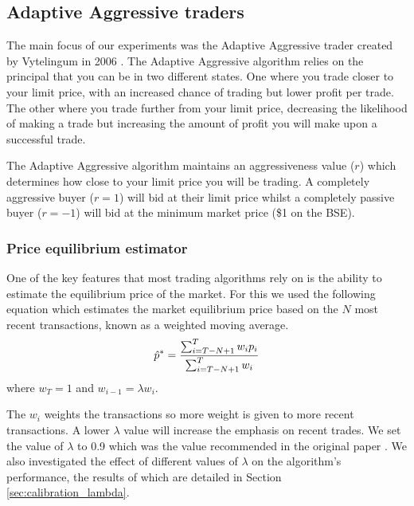 \documentclass[preprint]{acm_proc_article-sp} %
\begin{document}
\subsection{Adaptive Aggressive traders} \label{sec:AA}
The main focus of our experiments was the Adaptive Aggressive trader created by
Vytelingum in 2006 \cite{AA_thesis}. The Adaptive Aggressive algorithm relies on the principal that you can be in
two different states. One where you trade closer to your limit
price, with an increased chance of trading but lower profit per trade. The other where you
trade further from your limit price, decreasing the likelihood of making a
trade but increasing the amount of profit you will make upon a successful trade.

The Adaptive Aggressive algorithm maintains an aggressiveness value ($r$) which
determines how close to your limit price you will be trading. A completely
aggressive buyer ($r = 1$) will bid at their limit price whilst a completely
passive buyer ($r = -1$) will bid at the minimum market price (\$1 on the BSE).\\



\subsubsection{Price equilibrium estimator}
One of the key features that most trading algorithms rely on is the ability to
estimate the equilibrium price of the market. For this we used the following
equation which estimates the market equilibrium price based on the $N$ most
recent transactions, known as a weighted moving average.  \begin{equation} \hat
p^* = \frac{\sum^T_{i=T-N+1}w_ip_i}{\sum^T_{i=T-N+1}w_i}\\
\label{eqn:equilibrium_estimator} \end{equation} where $w_T = 1$ and $w_{i-1} =
\lambda w_i$.

The $w_i$ weights the transactions so more weight is given to more recent
transactions. A lower $\lambda$ value will increase the emphasis on recent
trades. We set the value of $\lambda$ to 0.9 which was the value recommended in
the original paper \cite[p.~100]{AA_thesis}. We also investigated the effect of
different values of $\lambda$ on the algorithm's performance, the results of
which are detailed in Section \ref{sec:calibration_lambda}.\\
\end{document}
